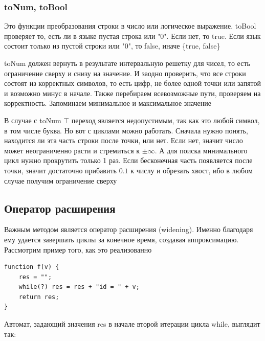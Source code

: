 \subsubsection*{toNum, toBool}
Это функции преобразования строки в число или логическое выражение. toBool проверяет то, есть ли в языке пустая строка или "0". Если нет, то true. Если язык состоит только из пустой строки или "0", то false, иначе \{true, false\}

toNum должен вернуть в результате интервальную решетку для чисел, то есть ограничение сверху и снизу на значение. И заодно проверить, что все строки состоят из корректных символов, то есть цифр, не более одной точки или запятой и возможно минус в начале. Также перебираем всевозможные пути, проверяем на корректность. Запоминаем минимальное и максимальное значение

В случае с toNum $\top$ переход является недопустимым, так как это любой символ, в том числе буква. Но вот с циклами можно работать. Сначала нужно понять, находится ли эта часть строки после точки, или нет. Если нет, значит число может неограниченно расти и стремиться к $\pm \infty$. А для поиска минимального цикл нужно прокрутить только 1 раз. Если бесконечная часть появляется после точки, значит достаточно прибавить $0.1$ к числу и обрезать хвост, ибо в любом случае получим ограничение сверху

\newpage
\subsection{Оператор расширения}
Важным методом является оператор расширения (widening). Именно благодаря ему удается завершать циклы за конечное время, создавая аппроксимацию. Рассмотрим пример того, как это реализованно

\begin{lstlisting}[caption={Пример применения widening}]
function f(v) {
    res = "";
    while(?) res = res + "id = " + v;
    return res;
}
\end{lstlisting}

Автомат, задающий значения res в начале второй итерации цикла while, выглядит так:
\begin{figure}[h]
    \centering
\end{figure}

